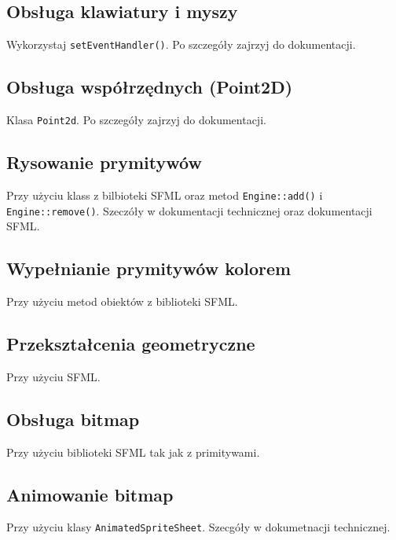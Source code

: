 \documentclass[11pt]{article}
\begin{document}
\subsection{Obsługa klawiatury i myszy}
\label{sec:org7051f2d}
Wykorzystaj \texttt{setEventHandler()}. Po szczegóły zajrzyj do dokumentacji.
\subsection{Obsługa współrzędnych (Point2D)}
\label{sec:org5c34cc2}
Klasa \texttt{Point2d}. Po szczegóły zajrzyj do dokumentacji.
\subsection{Rysowanie prymitywów}
\label{sec:orgaf6f775}
Przy użyciu klass z bilbioteki SFML oraz metod \texttt{Engine::add()} i \texttt{Engine::remove()}.
Szeczóły w dokumentacji technicznej oraz dokumentacji SFML.
\subsection{Wypełnianie prymitywów kolorem}
\label{sec:orgc100e8e}
Przy użyciu metod obiektów z biblioteki SFML.
\subsection{Przekształcenia geometryczne}
\label{sec:org2f66ac4}
Przy użyciu SFML.
\subsection{Obsługa bitmap}
\label{sec:org06419c2}
Przy użyciu biblioteki SFML tak jak z primitywami.
\subsection{Animowanie bitmap}
\label{sec:org50332ef}
Przy użyciu klasy \texttt{AnimatedSpriteSheet}. Szecgóły w dokumetnacji technicznej.
\end{document}
